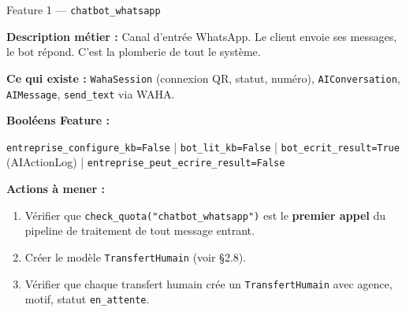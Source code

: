 \documentclass[11pt,a4paper]{article}
\newcommand{\slug}[1]{\texttt{\color{AGTDark}#1}}
\begin{document}
\begin{featurebox}{Feature 1 — \slug{chatbot\_whatsapp}}

\textbf{Description métier :} Canal d'entrée WhatsApp. Le client envoie ses
messages, le bot répond. C'est la plomberie de tout le système.

\textbf{Ce qui existe :} \slug{WahaSession} (connexion QR, statut, numéro),
\slug{AIConversation}, \slug{AIMessage}, \slug{send\_text} via WAHA.

\medskip
\textbf{Booléens Feature :}
\begin{decisionbox}
\texttt{entreprise\_configure\_kb=False} | \texttt{bot\_lit\_kb=False} |
\texttt{bot\_ecrit\_result=True} (AIActionLog) | \texttt{entreprise\_peut\_ecrire\_result=False}
\end{decisionbox}

\medskip
\textbf{Actions à mener :}
\begin{enumerate}
  \item Vérifier que \slug{check\_quota("chatbot\_whatsapp")} est le \textbf{premier appel}
        du pipeline de traitement de tout message entrant.
  \item Créer le modèle \slug{TransfertHumain} (voir §2.8).
  \item Vérifier que chaque transfert humain crée un \slug{TransfertHumain} avec agence,
        motif, statut \texttt{en\_attente}.
\end{enumerate}

\end{featurebox}

\bigskip
\end{document}
